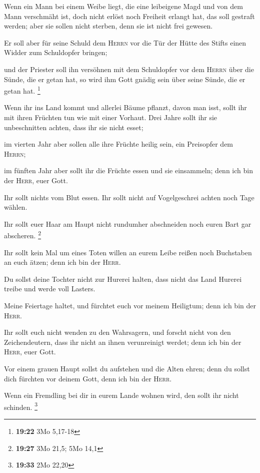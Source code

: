 Wenn ein Mann bei einem Weibe liegt, die eine leibeigene
Magd und von dem Mann verschmäht ist, doch nicht erlöst noch Freiheit
erlangt hat, das soll gestraft werden; aber sie sollen nicht sterben,
denn sie ist nicht frei gewesen.

 Er soll aber für seine Schuld dem \textsc{Herrn} vor die
Tür der Hütte des Stifts einen Widder zum Schuldopfer bringen;

 und der Priester soll ihn versöhnen mit dem Schuldopfer
vor dem \textsc{Herrn} über die Sünde, die er getan hat, so wird ihm
Gott gnädig sein über seine Sünde, die er getan hat. \footnote{\textbf{19:22}
  3Mo 5,17-18}

 Wenn ihr ins Land kommt und allerlei Bäume pflanzt,
davon man isst, sollt ihr mit ihren Früchten tun wie mit einer Vorhaut.
Drei Jahre sollt ihr sie unbeschnitten achten, dass ihr sie nicht esset;

 im vierten Jahr aber sollen alle ihre Früchte heilig
sein, ein Preisopfer dem \textsc{Herrn};

 im fünften Jahr aber sollt ihr die Früchte essen und sie
einsammeln; denn ich bin der \textsc{Herr}, euer Gott.

 Ihr sollt nichts vom Blut essen. Ihr sollt nicht auf
Vogelgeschrei achten noch Tage wählen.

 Ihr sollt euer Haar am Haupt nicht rundumher abschneiden
noch euren Bart gar abscheren. \footnote{\textbf{19:27} 3Mo 21,5; 5Mo
  14,1}

 Ihr sollt kein Mal um eines Toten willen an eurem Leibe
reißen noch Buchstaben an euch ätzen; denn ich bin der \textsc{Herr}.

 Du sollst deine Tochter nicht zur Hurerei halten, dass
nicht das Land Hurerei treibe und werde voll Lasters.

 Meine Feiertage haltet, und fürchtet euch vor meinem
Heiligtum; denn ich bin der \textsc{Herr}.

 Ihr sollt euch nicht wenden zu den Wahrsagern, und
forscht nicht von den Zeichendeutern, dass ihr nicht an ihnen
verunreinigt werdet; denn ich bin der \textsc{Herr}, euer Gott.

 Vor einem grauen Haupt sollst du aufstehen und die Alten
ehren; denn du sollst dich fürchten vor deinem Gott, denn ich bin der
\textsc{Herr}.

 Wenn ein Fremdling bei dir in eurem Lande wohnen wird,
den sollt ihr nicht schinden. \footnote{\textbf{19:33} 2Mo 22,20}

